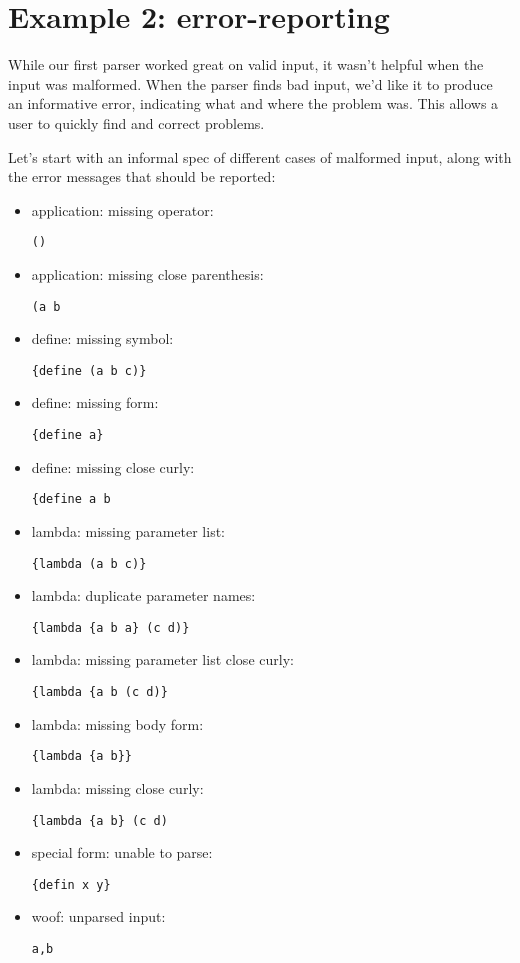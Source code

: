 \documentclass{tmr}
\begin{document}
\section{Example 2: error-reporting}
While our first parser worked great on valid input, it wasn't helpful
when the input was malformed.  When the parser finds bad input, we'd like it to 
produce an informative error, indicating what and where the problem was.  
This allows a user to quickly find and correct problems.

Let's start with an informal spec of different cases of malformed input, along 
with the error messages that should be reported: 
\begin{itemize}
  \item application: missing operator:  \begin{verbatim}()\end{verbatim}
  \item application: missing close parenthesis:  \begin{verbatim}(a b\end{verbatim}
  \item define: missing symbol:  \begin{verbatim}{define (a b c)}\end{verbatim}
  \item define: missing form:  \begin{verbatim}{define a}\end{verbatim}
  \item define: missing close curly:  \begin{verbatim}{define a b\end{verbatim}
  \item lambda: missing parameter list:  \begin{verbatim}{lambda (a b c)}\end{verbatim}
  \item lambda: duplicate parameter names:  \begin{verbatim}{lambda {a b a} (c d)}\end{verbatim}
  \item lambda: missing parameter list close curly:  \begin{verbatim}{lambda {a b (c d)}\end{verbatim}
  \item lambda: missing body form:  \begin{verbatim}{lambda {a b}}\end{verbatim}
  \item lambda: missing close curly:  \begin{verbatim}{lambda {a b} (c d)\end{verbatim}
  \item special form: unable to parse:  \begin{verbatim}{defin x y}\end{verbatim}
  \item woof: unparsed input:  \begin{verbatim}a,b\end{verbatim}
\end{itemize}
\end{document}
